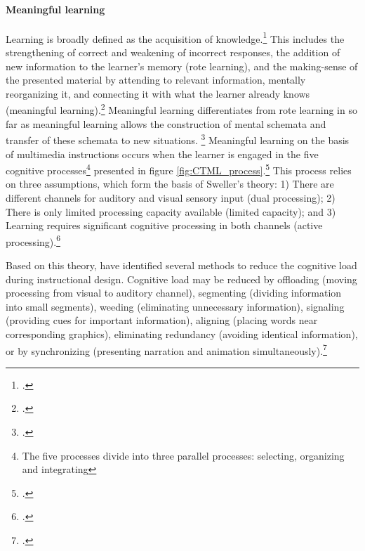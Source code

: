 \paragraph{Meaningful learning} Learning is broadly defined as the acquisition of knowledge.\footcites[Cf.][p.226]{MayerRotemeaningfullearning2002} This includes the strengthening of correct and weakening of incorrect responses, the addition of new information to the learner's memory (rote learning), and the making-sense of the presented material by attending to relevant information, mentally reorganizing it, and connecting it with what the learner already knows (meaningful learning).\footcites[Cf.][chapter 2, paragraph 5]{ClarkElearningscienceinstruction2016} Meaningful learning differentiates from rote learning in so far as meaningful learning allows the construction of mental schemata and transfer of these schemata to new situations.%
\footcites[Cf.][p.227]{MayerRotemeaningfullearning2002}[cf.][p.299]{SwellerCognitiveloadtheory1994} Meaningful learning on the basis of multimedia instructions occurs when the learner is engaged in the five cognitive processes\footnote{The five processes divide into three parallel processes: selecting, organizing and integrating} presented in figure \ref{fig:CTML_process}.\footcites[Cf.][p.111]{MayerCognitiveTheoryMultimedia1999}[cf.][p.35]{SordenCognitiveTheoryMultimedia2012}[cf.][p.43]{MayerNineWaysReduce2003} This process relies on three assumptions, which form the basis of Sweller's theory: 1) There are different channels for auditory and visual sensory input (dual processing); 2) There is only limited processing capacity available (limited capacity); and 3) Learning requires significant cognitive processing in both channels (active processing).\footcites[Cf.][p.44]{MayerNineWaysReduce2003}

Based on this theory, \cite{MayerNineWaysReduce2003} have identified several methods to reduce the cognitive load during instructional design. Cognitive load may be reduced by offloading (moving processing from visual to auditory channel), segmenting (dividing information into small segments), weeding (eliminating unnecessary information), signaling (providing cues for important information), aligning (placing words near corresponding graphics), eliminating redundancy (avoiding identical information), or by synchronizing (presenting narration and animation simultaneously).\footcites[Cf.][p.46]{MayerNineWaysReduce2003}

